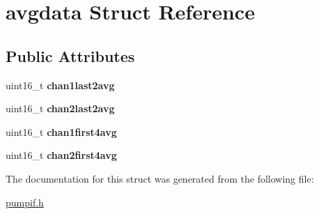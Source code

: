\hypertarget{structavgdata}{\section{avgdata Struct Reference}
\label{structavgdata}
}
\subsection*{Public Attributes}
\begin{DoxyCompactItemize}
\item 
\hypertarget{structavgdata_a9fbad348d04a9a3dc3a95be9cca2fe90}{uint16\-\_\-t {\bfseries chan1last2avg}}\label{structavgdata_a9fbad348d04a9a3dc3a95be9cca2fe90}

\item 
\hypertarget{structavgdata_a99685be9166ba10261d99614cb7cac24}{uint16\-\_\-t {\bfseries chan2last2avg}}\label{structavgdata_a99685be9166ba10261d99614cb7cac24}

\item 
\hypertarget{structavgdata_a96150ee37b1495607a2aaad675d5b4d1}{uint16\-\_\-t {\bfseries chan1first4avg}}\label{structavgdata_a96150ee37b1495607a2aaad675d5b4d1}

\item 
\hypertarget{structavgdata_a0144e7670d8b451dca1ded1a3db5a023}{uint16\-\_\-t {\bfseries chan2first4avg}}\label{structavgdata_a0144e7670d8b451dca1ded1a3db5a023}

\end{DoxyCompactItemize}


The documentation for this struct was generated from the following file\-:\begin{DoxyCompactItemize}
\item 
\hyperlink{pumpif_8h}{pumpif.\-h}\end{DoxyCompactItemize}
